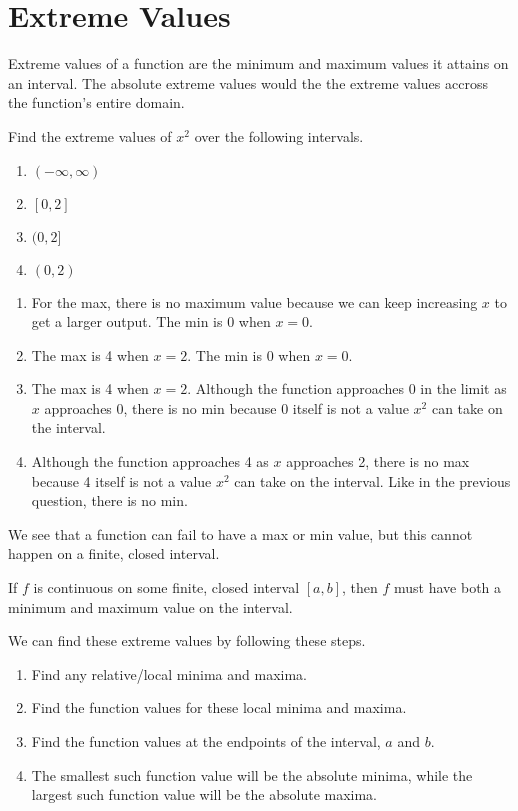 \section{Extreme Values}
Extreme values of a function are the minimum and maximum values it attains on an interval.
The absolute extreme values would the the extreme values accross the function's entire domain.

\begin{example}
	Find the extreme values of $x^2$ over the following intervals.
	\begin{enumerate}
		\item $(-\infty, \infty)$
		\item $[0,2]$
		\item $(0,2]$
		\item $(0,2)$
	\end{enumerate}
\end{example}
\begin{answer}
	\begin{enumerate}
		\item For the max, there is no maximum value because we can keep increasing $x$ to get a larger output.
			The min is 0 when $x=0$.
		\item The max is 4 when $x=2$.
			The min is 0 when $x=0$.
		\item The max is 4 when $x=2$.
			Although the function approaches 0 in the limit as $x$ approaches 0, there is no min because 0 itself is not a value $x^2$ can take on the interval.
		\item Although the function approaches 4 as $x$ approaches 2, there is no max because 4 itself is not a value $x^2$ can take on the interval.
			Like in the previous question, there is no min.
	\end{enumerate}
	We see that a function can fail to have a max or min value, but this cannot happen on a finite, closed interval.
\end{answer}

\begin{theorem}
	If $f$ is continuous on some finite, closed interval $[a,b]$, then $f$ must have both a minimum and maximum value on the interval.
\end{theorem}


We can find these extreme values by following these steps.
\begin{enumerate}
	\item Find any relative/local minima and maxima.
	\item Find the function values for these local minima and maxima.
	\item Find the function values at the endpoints of the interval, $a$ and $b$.
	\item The smallest such function value will be the absolute minima, while the largest such function value will be the absolute maxima.
\end{enumerate}

